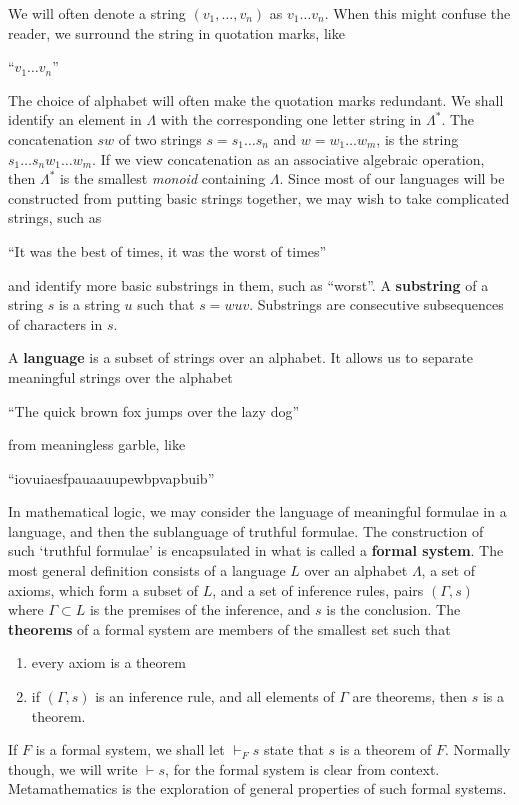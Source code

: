 We will often denote a string $(v_1, \dots, v_n)$ as $v_1 \dots v_n$. When this might confuse the reader, we surround the string in quotation marks, like
%
\begin{center}
    ``$v_1 \dots v_n$''
\end{center}
%
The choice of alphabet will often make the quotation marks redundant. We shall identify an element in $\Lambda$ with the corresponding one letter string in $\Lambda^*$. The concatenation $sw$ of two strings $s = s_1 \dots s_n$ and $w = w_1 \dots w_m$, is the string $s_1 \dots s_n w_1 \dots w_m$. If we view concatenation as an associative algebraic operation, then $\Lambda^*$ is the smallest {\it monoid} containing $\Lambda$. Since most of our languages will be constructed from putting basic strings together, we may wish to take complicated strings, such as
%
\begin{center}
    ``It was the best of times, it was the worst of times''
\end{center}
%
and identify more basic substrings in them, such as ``worst''. A {\bf substring} of a string $s$ is a string $u$ such that $s = wuv$. Substrings are consecutive subsequences of characters in $s$. 

A {\bf language} is a subset of strings over an alphabet. It allows us to separate meaningful strings over the alphabet
%
\begin{center}
    ``The quick brown fox jumps over the lazy dog''
\end{center}
%
from meaningless garble, like
%
\begin{center}
    ``iovuiaesfpauaauupewbpvapbuib''
\end{center}
%
In mathematical logic, we may consider the language of meaningful formulae in a language, and then the sublanguage of truthful formulae. The construction of such `truthful formulae' is encapsulated in what is called a {\bf formal system}. The most general definition consists of a language $L$ over an alphabet $\Lambda$, a set of axioms, which form a subset of $L$, and a set of inference rules, pairs $(\Gamma, s)$ where $\Gamma \subset L$ is the premises of the inference, and $s$ is the conclusion. The {\bf theorems} of a formal system are members of the smallest set such that
%
\begin{enumerate}
    \item every axiom is a theorem
    \item if $(\Gamma, s)$ is an inference rule, and all elements of $\Gamma$ are theorems, then $s$ is a theorem.
\end{enumerate}
%
If $F$ is a formal system, we shall let $\vdash_F s$ state that $s$ is a theorem of $F$. Normally though, we will write $\vdash s$, for the formal system is clear from context. Metamathematics is the exploration of general properties of such formal systems.

